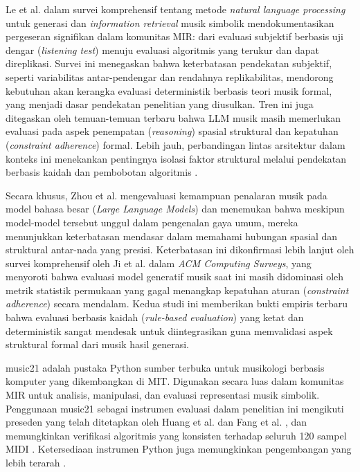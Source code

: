 Le et al. \parencite{le2025} dalam survei komprehensif tentang metode \textit{natural language processing} untuk generasi dan \textit{information retrieval} musik simbolik mendokumentasikan pergeseran signifikan dalam komunitas MIR: dari evaluasi subjektif berbasis uji dengar (\textit{listening test}) menuju evaluasi algoritmis yang terukur dan dapat direplikasi. Survei ini menegaskan bahwa keterbatasan pendekatan subjektif, seperti variabilitas antar-pendengar dan rendahnya replikabilitas, mendorong kebutuhan akan kerangka evaluasi deterministik berbasis teori musik formal, yang menjadi dasar pendekatan penelitian yang diusulkan. Tren ini juga ditegaskan oleh temuan-temuan terbaru bahwa LLM musik masih memerlukan evaluasi pada aspek penempatan (\textit{reasoning}) spasial struktural dan kepatuhan (\textit{constraint adherence}) formal. Lebih jauh, perbandingan lintas arsitektur dalam konteks ini menekankan pentingnya isolasi faktor struktural melalui pendekatan berbasis kaidah dan pembobotan algoritmis \parencite{Chen2020}.

Secara khusus, Zhou et al. \parencite{Zhou2024} mengevaluasi kemampuan penalaran musik pada model bahasa besar (\textit{Large Language Models}) dan menemukan bahwa meskipun model-model tersebut unggul dalam pengenalan gaya umum, mereka menunjukkan keterbatasan mendasar dalam memahami hubungan spasial dan struktural antar-nada yang presisi. Keterbatasan ini dikonfirmasi lebih lanjut oleh survei komprehensif oleh Ji et al. \parencite{Ji2023} dalam \textit{ACM Computing Surveys}, yang menyoroti bahwa evaluasi model generatif musik saat ini masih didominasi oleh metrik statistik permukaan yang gagal menangkap kepatuhan aturan (\textit{constraint adherence}) secara mendalam. Kedua studi ini memberikan bukti empiris terbaru bahwa evaluasi berbasis kaidah (\textit{rule-based evaluation}) yang ketat dan deterministik sangat mendesak untuk diintegrasikan guna memvalidasi aspek struktural formal dari musik hasil generasi.

music21 \parencite{cuthbert2010} adalah pustaka Python sumber terbuka untuk musikologi berbasis komputer yang dikembangkan di MIT. Digunakan secara luas dalam komunitas MIR untuk analisis, manipulasi, dan evaluasi representasi musik simbolik. Penggunaan music21 sebagai instrumen evaluasi dalam penelitian ini mengikuti preseden yang telah ditetapkan oleh Huang et al. \parencite{huang2017} dan Fang et al. \parencite{fang2020}, dan memungkinkan verifikasi algoritmis yang konsisten terhadap seluruh 120 sampel MIDI \parencite{cuthbert2020}. Ketersediaan instrumen Python juga memungkinkan pengembangan yang lebih terarah \parencite{dong2020}.

